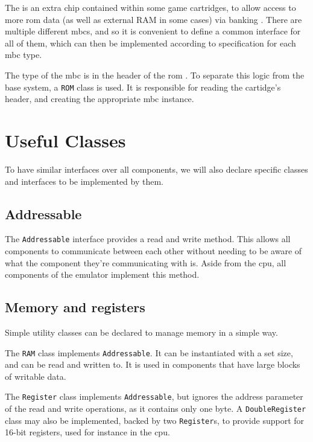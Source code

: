 \documentclass[11pt]{report}
\begin{document}
The  is an extra chip contained within some game cartridges, to allow access to more \gls{rom} data (as well as external RAM in some cases) via banking \cite[MBCs]{pandoc}. There are multiple different \glspl{mbc}, and so it is convenient to define a common interface for all of them, which can then be implemented according to specification for each \gls{mbc} type.

The type of the \gls{mbc} is in the header of the \gls{rom} \cite[The Cartridge Header]{pandoc}. To separate this logic from the base system, a \texttt{ROM} class is used. It is responsible for reading the cartidge's header, and creating the appropriate \gls{mbc} instance.

\section{Useful Classes}

To have similar interfaces over all components, we will also declare specific classes and interfaces to be implemented by them.

\subsection{Addressable}

The \texttt{Addressable} interface provides a read and write method. This allows all components to communicate between each other without needing to be aware of what the component they're communicating with is. Aside from the \gls{cpu}, all components of the emulator implement this method.

\subsection{Memory and registers}

Simple utility classes can be declared to manage memory in a simple way. 

The \texttt{RAM} class implements \texttt{Addressable}. It can be instantiated with a set size, and can be read and written to. It is used in components that have large blocks of writable data.

The \texttt{Register} class implements \texttt{Addressable}, but ignores the address parameter of the read and write operations, as it contains only one byte. A \texttt{DoubleRegister} class may also be implemented, backed by two \texttt{Register}s, to provide support for 16-bit registers, used for instance in the \gls{cpu}.
\end{document}

